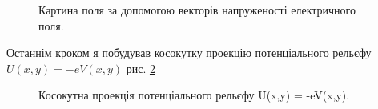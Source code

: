 \documentclass[14pt,a4paper]{scrartcl}
\begin{document}
\begin{center}
\begin{figure}[h]
\caption{Картина поля за допомогою векторів напруженості електричного поля.}
\label{ris:image3}
\end{figure}

\newpage
Останнім кроком я побудував косокутку проекцію потенціального рельєфу $U(x,y) = -eV(x,y)$ рис. \ref{ris:image4}
\begin{figure}[h]
\caption{Косокутна проекція потенціального рельєфу U(x,y) = -eV(x,y).}
\label{ris:image4}
\end{figure}
\end{center}
\end{document}
